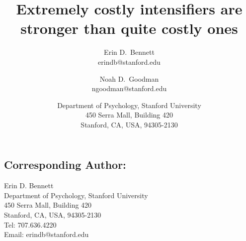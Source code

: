 \documentclass{article}
\title{Extremely costly intensifiers are stronger than quite costly ones}
\author{
	Erin D.~Bennett \\
	erindb@stanford.edu \\
	\and
	Noah D.~Goodman \\
	ngoodman@stanford.edu
}
\date{
    Department of Psychology, Stanford University \\
	450 Serra Mall, Building 420 \\
	Stanford, CA, USA, 94305-2130 \\
}
\begin{document}
\maketitle

\subsection*{Corresponding Author:}
Erin D. Bennett \\
Department of Psychology, Stanford University \\
450 Serra Mall, Building 420 \\
Stanford, CA, USA, 94305-2130 \\
Tel: 707.636.4220 \\
Email: erindb@stanford.edu

\end{document}
